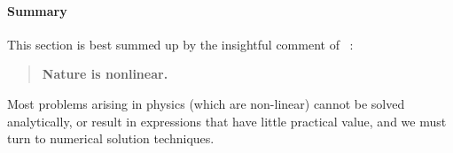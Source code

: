 
\paragraph{Summary}

This section is best summed up by the insightful comment of
~\cite[p.~587]{strang-am}:  
\begin{quote}
  \centerline{\bf Nature is nonlinear.}
\end{quote}
Most problems arising in physics (which are non-linear) cannot be solved
analytically, or result in expressions that have little practical
value, and we must turn to numerical solution techniques.

